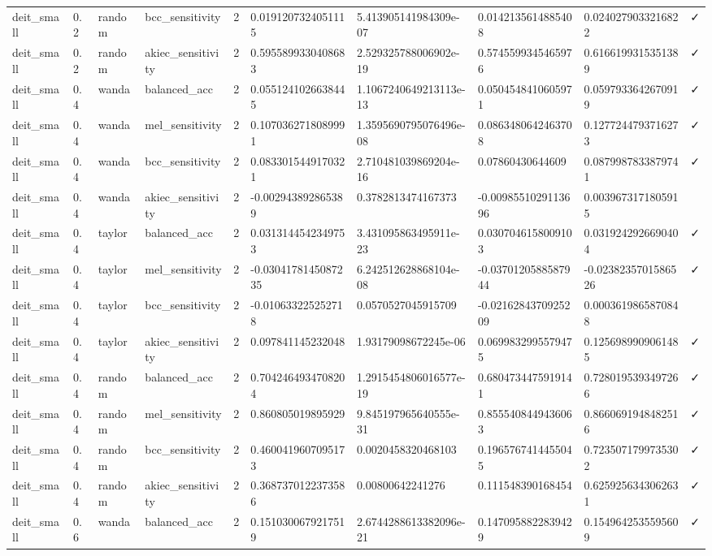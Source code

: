 \begin{table}[t]
\begin{tabular}{llllllllll}
deit\_small & 0.2 & random & bcc\_sensitivity & 2 & 0.0191207324051115 & 5.413905141984309e-07 & 0.0142135614885408 & 0.0240279033216822 & ✓ \\
deit\_small & 0.2 & random & akiec\_sensitivity & 2 & 0.5955899330408683 & 2.529325788006902e-19 & 0.5745599345465976 & 0.6166199315351389 & ✓ \\
deit\_small & 0.4 & wanda & balanced\_acc & 2 & 0.0551241026638445 & 1.1067240649213113e-13 & 0.0504548410605971 & 0.0597933642670919 & ✓ \\
deit\_small & 0.4 & wanda & mel\_sensitivity & 2 & 0.1070362718089991 & 1.3595690795076496e-08 & 0.0863480642463708 & 0.1277244793716273 & ✓ \\
deit\_small & 0.4 & wanda & bcc\_sensitivity & 2 & 0.0833015449170321 & 2.710481039869204e-16 & 0.07860430644609 & 0.0879987833879741 & ✓ \\
deit\_small & 0.4 & wanda & akiec\_sensitivity & 2 & -0.002943892865389 & 0.3782813474167373 & -0.0098551029113696 & 0.0039673171805915 &   \\
deit\_small & 0.4 & taylor & balanced\_acc & 2 & 0.0313144542349753 & 3.431095863495911e-23 & 0.0307046158009103 & 0.0319242926690404 & ✓ \\
deit\_small & 0.4 & taylor & mel\_sensitivity & 2 & -0.0304178145087235 & 6.242512628868104e-08 & -0.0370120588587944 & -0.0238235701586526 & ✓ \\
deit\_small & 0.4 & taylor & bcc\_sensitivity & 2 & -0.010633225252718 & 0.0570527045915709 & -0.0216284370925209 & 0.0003619865870848 &   \\
deit\_small & 0.4 & taylor & akiec\_sensitivity & 2 & 0.097841145232048 & 1.93179098672245e-06 & 0.0699832995579475 & 0.1256989909061485 & ✓ \\
deit\_small & 0.4 & random & balanced\_acc & 2 & 0.7042464934708204 & 1.2915454806016577e-19 & 0.6804734475919141 & 0.7280195393497266 & ✓ \\
deit\_small & 0.4 & random & mel\_sensitivity & 2 & 0.860805019895929 & 9.845197965640555e-31 & 0.8555408449436063 & 0.8660691948482516 & ✓ \\
deit\_small & 0.4 & random & bcc\_sensitivity & 2 & 0.4600419607095173 & 0.0020458320468103 & 0.1965767414455045 & 0.7235071799735302 & ✓ \\
deit\_small & 0.4 & random & akiec\_sensitivity & 2 & 0.3687370122373586 & 0.00800642241276 & 0.111548390168454 & 0.6259256343062631 & ✓ \\
deit\_small & 0.6 & wanda & balanced\_acc & 2 & 0.1510300679217519 & 2.6744288613382096e-21 & 0.1470958822839429 & 0.1549642535595609 & ✓ \\

\end{tabular}
\end{table}

